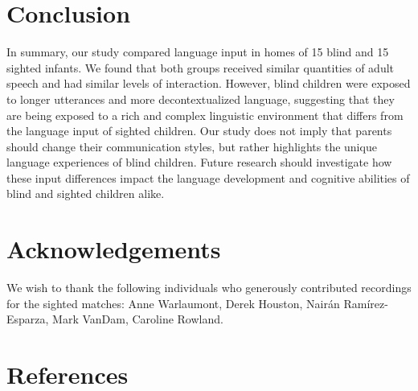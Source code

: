 \documentclass[
  man]{apa6}
\begin{document}
\hypertarget{conclusion}{%
\section{Conclusion}\label{conclusion}}

In summary, our study compared language input in homes of 15 blind and 15 sighted infants. We found that both groups received similar quantities of adult speech and had similar levels of interaction. However, blind children were exposed to longer utterances and more decontextualized language, suggesting that they are being exposed to a rich and complex linguistic environment that differs from the language input of sighted children. Our study does not imply that parents should change their communication styles, but rather highlights the unique language experiences of blind children. Future research should investigate how these input differences impact the language development and cognitive abilities of blind and sighted children alike.

\hypertarget{acknowledgements}{%
\section{Acknowledgements}\label{acknowledgements}}

We wish to thank the following individuals who generously contributed recordings for the sighted matches: Anne Warlaumont, Derek Houston, Nairán Ramírez-Esparza, Mark VanDam, Caroline Rowland.

\hypertarget{references}{%
\section*{References}\label{references}}
\end{document}
